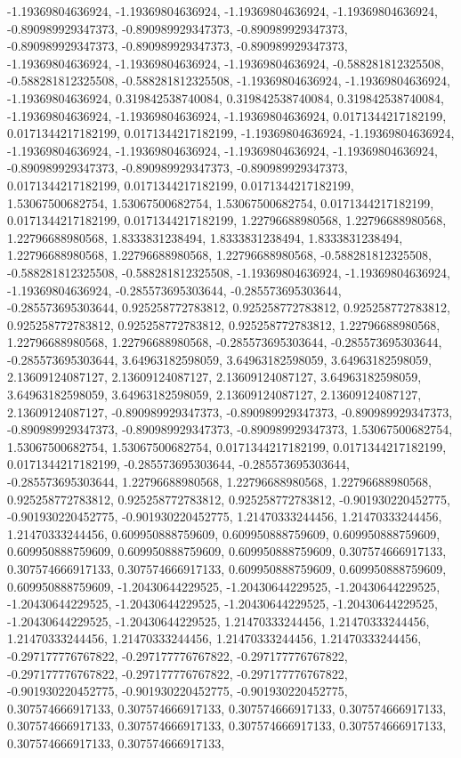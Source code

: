 \documentclass[
  ,man]{apa6}
\begin{document}
-1.19369804636924, -1.19369804636924, -1.19369804636924, -1.19369804636924, -0.890989929347373, -0.890989929347373, -0.890989929347373, -0.890989929347373, -0.890989929347373, -0.890989929347373, -1.19369804636924, -1.19369804636924, -1.19369804636924, -0.588281812325508, -0.588281812325508, -0.588281812325508, -1.19369804636924, -1.19369804636924, -1.19369804636924, 0.319842538740084, 0.319842538740084, 0.319842538740084, -1.19369804636924, -1.19369804636924, -1.19369804636924, 0.0171344217182199,
0.0171344217182199, 0.0171344217182199, -1.19369804636924, -1.19369804636924, -1.19369804636924, -1.19369804636924, -1.19369804636924, -1.19369804636924, -0.890989929347373, -0.890989929347373, -0.890989929347373, 0.0171344217182199, 0.0171344217182199, 0.0171344217182199, 1.53067500682754, 1.53067500682754, 1.53067500682754, 0.0171344217182199, 0.0171344217182199, 0.0171344217182199, 1.22796688980568, 1.22796688980568, 1.22796688980568, 1.8333831238494, 1.8333831238494, 1.8333831238494, 1.22796688980568,
1.22796688980568, 1.22796688980568, -0.588281812325508, -0.588281812325508, -0.588281812325508, -1.19369804636924, -1.19369804636924, -1.19369804636924, -0.285573695303644, -0.285573695303644, -0.285573695303644, 0.925258772783812, 0.925258772783812, 0.925258772783812, 0.925258772783812, 0.925258772783812, 0.925258772783812, 1.22796688980568, 1.22796688980568, 1.22796688980568, -0.285573695303644, -0.285573695303644, -0.285573695303644, 3.64963182598059, 3.64963182598059, 3.64963182598059, 2.13609124087127,
2.13609124087127, 2.13609124087127, 3.64963182598059, 3.64963182598059, 3.64963182598059, 2.13609124087127, 2.13609124087127, 2.13609124087127, -0.890989929347373, -0.890989929347373, -0.890989929347373, -0.890989929347373, -0.890989929347373, -0.890989929347373, 1.53067500682754, 1.53067500682754, 1.53067500682754, 0.0171344217182199, 0.0171344217182199, 0.0171344217182199, -0.285573695303644, -0.285573695303644, -0.285573695303644, 1.22796688980568, 1.22796688980568, 1.22796688980568, 0.925258772783812,
0.925258772783812, 0.925258772783812, -0.901930220452775, -0.901930220452775, -0.901930220452775, 1.21470333244456, 1.21470333244456, 1.21470333244456, 0.609950888759609, 0.609950888759609, 0.609950888759609, 0.609950888759609, 0.609950888759609, 0.609950888759609, 0.307574666917133, 0.307574666917133, 0.307574666917133, 0.609950888759609, 0.609950888759609, 0.609950888759609, -1.20430644229525, -1.20430644229525, -1.20430644229525, -1.20430644229525, -1.20430644229525, -1.20430644229525, -1.20430644229525,
-1.20430644229525, -1.20430644229525, 1.21470333244456, 1.21470333244456, 1.21470333244456, 1.21470333244456, 1.21470333244456, 1.21470333244456, -0.297177776767822, -0.297177776767822, -0.297177776767822, -0.297177776767822, -0.297177776767822, -0.297177776767822, -0.901930220452775, -0.901930220452775, -0.901930220452775, 0.307574666917133, 0.307574666917133, 0.307574666917133, 0.307574666917133, 0.307574666917133, 0.307574666917133, 0.307574666917133, 0.307574666917133, 0.307574666917133, 0.307574666917133,
\end{document}
